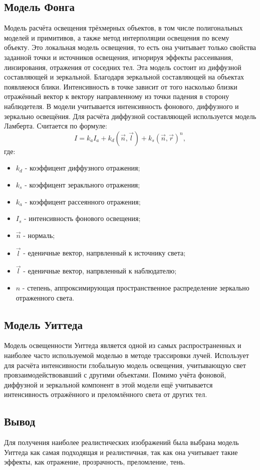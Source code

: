 \documentclass[12pt,a4paper,oneside]{report}
\begin{document}
			\subsection{Модель Фонга}
				\quad Модель расчёта освещения трёхмерных объектов, в том числе полигональных моделей и примитивов, а также метод интерполяции освещения по всему объекту. Это локальная модель освещения, то есть она учитывает только свойства заданной точки и источников освещения, игнорируя эффекты рассеивания, линзирования, отражения от соседних тел. Эта модель состоит из диффузной составляющей и зеркальной. Благодаря зеркальной составляющей на объектах появляеюся блики. Интенсивность в точке зависит от того насколько близки отражённый вектор к вектору направленному из точки падения в сторону наблюдетеля. В модели учитывается интенсивность фонового, диффузного и зеркально освещёния. Для расчёта диффузной составляющей используется модель Ламберта. Считается по формуле:
				\[
					I = k_{a}I_{a} + k_{d}(\vec{n}, \vec{l}) + k_{s}(\vec{n}, \vec{r})^n,
				\]
				где:
				\begin{itemize}
					\item $k_{d}$ - коэффицент диффузного отражения;
					\item $k_{s}$ - коэффицент зеракльного отражения;
					\item $k_{a}$ - коэффицент рассеянного отражения;
					\item $I_{s}$ - интенсивность фонового освещения;
					\item $\vec{n}$ -  нормаль;
					\item $\vec{l}$ - еденичные вектор, напрвленный к источнику света;
					\item $\vec{l}$ - еденичные вектор, напрвленный к наблюдателю;
					\item $n$ - степень, аппроксимирующая пространственное распределение зеркально отраженного света.
				\end{itemize}
			\subsection{Модель Уиттеда}
				\quad Модель освещенности Уиттеда является одной из самых распространенных и наиболее часто используемой моделью в методе трассировки лучей. Использует для расчёта интенсивности глобальную модель освещения, учитывающую свет провзаимодействовавший с другими объектами. Помимо учёта фоновой, диффузной и зеркальной компонент в этой модели ещё учитывается интенсивность отражённого и преломлённого света от других тел.
			\subsection{Вывод}
				\quad Для получения наиболее реалистических изображений была выбрана модель Уиттеда как самая подходящая и реалистичная, так как она учитывает такие эффекты, как отражение, прозрачность, преломление, тень.
\end{document}
